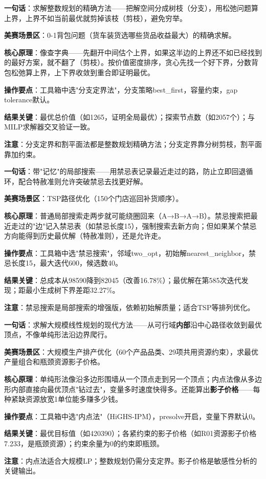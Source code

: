 \begin{algobrief}
\textbf{一句话}：求解整数规划的精确方法——把解空间分成树枝（分支），用松弛问题算上界，上界不如当前最优就剪掉该枝（剪枝），避免穷举。

\textbf{美赛场景区}：0-1背包问题（货车装货选哪些货品收益最大）的精确求解。

\textbf{核心原理}：像查字典——先翻开中间估个上界，如果这半边的上界还不如已经找到的最好方案，就不翻了（剪枝）。按价值密度排序，贪心先找一个好下界，分数背包松弛算上界，上下界收敛到重合即证明最优。

\textbf{操作要点}：工具箱中选"分支定界法"，分支策略best\_first，容量约束，gap tolerance默认。

\textbf{结果关键}：最优总价值（如1265，证明全局最优）；探索节点数（如2057个）；与MILP求解器交叉验证一致。

\textbf{注意}：分支定界和割平面法都是整数规划精确方法；分支定界靠分树剪枝，割平面靠加约束。
\end{algobrief}


\begin{algobrief}
\textbf{一句话}：带"记忆"的局部搜索——用禁忌表记录最近走过的路，防止立即回退循环，配合特赦准则允许突破禁忌去找更好解。

\textbf{美赛场景区}：TSP路径优化（150个门店巡回补货顺序）。

\textbf{核心原理}：普通局部搜索走两步就可能绕圈回来（A→B→A→B）。禁忌搜索把最近走过的"边"记入禁忌表（如禁忌长度15），强制搜索去新方向；但如果某个禁忌方向能得到历史最优解（特赦准则），还是允许走。

\textbf{操作要点}：工具箱中选"禁忌搜索"，邻域two\_opt，初始解nearest\_neighbor，禁忌长度15，最大迭代600，候选数40。

\textbf{结果关键}：总成本从98590降到82045（改善16.78\%）；最优解在第585次迭代发现；距最小生成树下界差距32.27\%。

\textbf{注意}：禁忌搜索是局部搜索的增强版，依赖初始解质量；适合TSP等排列优化。
\end{algobrief}


\begin{algobrief}
\textbf{一句话}：求解大规模线性规划的现代方法——从可行域\textbf{内部}沿中心路径收敛到最优顶点，不像单纯形法沿边界爬行。

\textbf{美赛场景区}：大规模生产排产优化（60个产品品类、29项共用资源约束），求最优产量组合和瓶颈资源影子价格。

\textbf{核心原理}：单纯形法像沿多边形围墙从一个顶点走到另一个顶点；内点法像从多边形内部直接向最优顶点"钻过去"，变量多时速度快得多。还能算出\textbf{影子价格}——每种紧缺资源放宽1单位能多赚多少钱。

\textbf{操作要点}：工具箱中选"内点法"（HiGHS-IPM），presolve开启，变量下界默认0。

\textbf{结果关键}：最优目标值（如420390）；各紧约束的影子价格（如R01资源影子价格7.233，是瓶颈资源）；约束余量为0的约束即瓶颈。

\textbf{注意}：内点法适合大规模LP；整数规划仍需分支定界。影子价格是敏感性分析的关键输出。
\end{algobrief}
